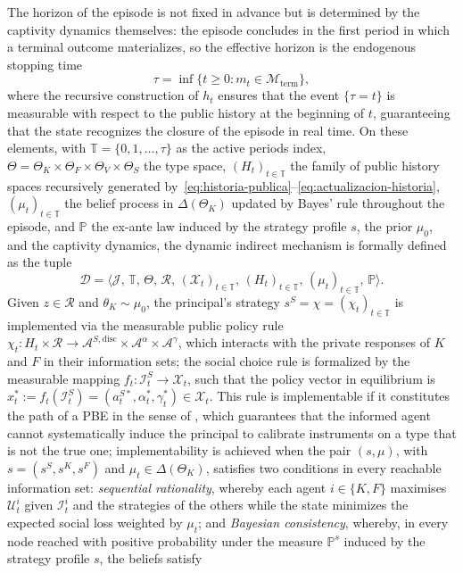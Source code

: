\documentclass[review,authoryear,12pt]{elsarticle}
\theoremstyle{plain}
\theoremstyle{definition}
\newcommand{\Prob}{\mathbb{P}}
\newcommand{\ThetaK}{\Theta_K}
\newcommand{\1}{\mathbf{1}}
\begin{document}
The horizon of the episode is not fixed in advance but is determined by the captivity dynamics themselves: the episode concludes in the first period in which a terminal outcome materializes, so the effective horizon is the endogenous stopping time
\begin{equation}
\tau=\inf\{t\geq 0:m_t\in\mathcal{M}_{\mathrm{term}}\},\label{eq:stopping-time}
\end{equation}
where the recursive construction of $h_t$ ensures that the event $\{\tau=t\}$ is measurable with respect to the public history at the beginning of $t$, guaranteeing that the state recognizes the closure of the episode in real time. On these elements, with $\mathbb{T}=\{0,1,\ldots,\tau\}$ as the active periods index, $\Theta=\ThetaK\times\Theta_F\times\Theta_V\times\Theta_S$ the type space, $(H_t)_{t\in\mathbb{T}}$ the family of public history spaces recursively generated by~\eqref{eq:historia-publica}--\eqref{eq:actualizacion-historia}, $(\mu_t)_{t\in\mathbb{T}}$ the belief process in $\Delta(\ThetaK)$ updated by Bayes' rule throughout the episode, and $\Prob$ the ex-ante law induced by the strategy profile $s$, the prior $\mu_0$, and the captivity dynamics, the dynamic indirect mechanism is formally defined as the tuple
\[
\mathcal{D}=\bigl\langle\mathcal{J},\,\mathbb{T},\,\Theta,\,\mathcal{R},\,(\mathcal{X}_t)_{t\in\mathbb{T}},\,(H_t)_{t\in\mathbb{T}},\,(\mu_t)_{t\in\mathbb{T}},\,\Prob\bigr\rangle.
\]
Given $z\in\mathcal{R}$ and $\theta_K\sim\mu_0$, the principal's strategy $s^S=\chi=(\chi_t)_{t\in\mathbb{T}}$ is implemented via the measurable public policy rule $\chi_t\colon H_t\times\mathcal{R}\to\mathcal{A}^{S,\mathrm{disc}}\times\mathcal{A}^{\alpha}\times\mathcal{A}^{\gamma}$, which interacts with the private responses of $K$ and $F$ in their information sets; the social choice rule is formalized by the measurable mapping $f_t\colon\mathcal{I}_t^S\to\mathcal{X}_t$, such that the policy vector in equilibrium is $x_t^\ast:=f_t(\mathcal{I}_t^S)=(a_t^{S\ast},\alpha_t^\ast,\gamma_t^\ast)\in\mathcal{X}_t$. This rule is implementable if it constitutes the path of a PBE in the sense of \citet{FudenbergTirole1991}, which guarantees that the informed agent cannot systematically induce the principal to calibrate instruments on a type that is not the true one; implementability is achieved when the pair $(s,\mu)$, with $s=(s^S,s^K,s^F)$ and $\mu_t\in\Delta(\ThetaK)$, satisfies two conditions in every reachable information set: \emph{sequential rationality}, whereby each agent $i\in\{K,F\}$ maximises $\mathcal{U}_t^i$ given $\mathcal{I}_t^i$ and the strategies of the others while the state minimizes the expected social loss weighted by $\mu_t$; and \emph{Bayesian consistency}, whereby, in every node reached with positive probability under the measure $\Prob^s$ induced by the strategy profile $s$, the beliefs satisfy
\end{document}
